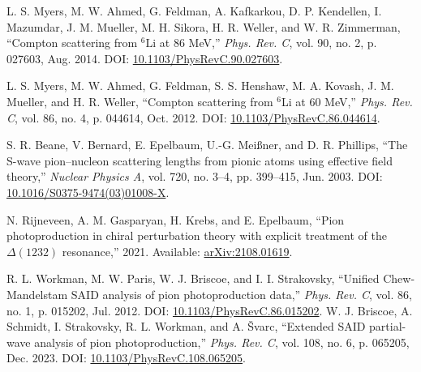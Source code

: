 \documentclass[a4paper,11pt]{article}
\begin{document}
\begin{thebibliography}{99}
L. S. Myers, M. W. Ahmed, G. Feldman, A. Kafkarkou, D. P. Kendellen, I. Mazumdar, J. M. Mueller, M. H. Sikora, H. R. Weller, and W. R. Zimmerman, ``Compton scattering from $^{6}\mathrm{Li}$ at 86 MeV,'' \textit{Phys. Rev. C}, vol. 90, no. 2, p. 027603, Aug. 2014. DOI: \href{https://link.aps.org/doi/10.1103/PhysRevC.90.027603}{10.1103/PhysRevC.90.027603}.

L. S. Myers, M. W. Ahmed, G. Feldman, S. S. Henshaw, M. A. Kovash, J. M. Mueller, and H. R. Weller, ``Compton scattering from $^{6}$Li at 60 MeV,'' \textit{Phys. Rev. C}, vol. 86, no. 4, p. 044614, Oct. 2012. DOI: \href{https://link.aps.org/doi/10.1103/PhysRevC.86.044614}{10.1103/PhysRevC.86.044614}.

S. R. Beane, V. Bernard, E. Epelbaum, U.-G. Meißner, and D. R. Phillips, ``The S-wave pion–nucleon scattering lengths from pionic atoms using effective field theory,'' \textit{Nuclear Physics A}, vol. 720, no. 3–4, pp. 399–415, Jun. 2003. DOI: \href{http://dx.doi.org/10.1016/S0375-9474(03)01008-X}{10.1016/S0375-9474(03)01008-X}.

N. Rijneveen, A. M. Gasparyan, H. Krebs, and E. Epelbaum, ``Pion photoproduction in chiral perturbation theory with explicit treatment of the $\Delta(1232)$ resonance,'' 2021. Available: \href{https://arxiv.org/abs/2108.01619}{arXiv:2108.01619}.

R. L. Workman, M. W. Paris, W. J. Briscoe, and I. I. Strakovsky, ``Unified Chew-Mandelstam SAID analysis of pion photoproduction data,'' \textit{Phys. Rev. C}, vol. 86, no. 1, p. 015202, Jul. 2012. DOI: \href{https://link.aps.org/doi/10.1103/PhysRevC.86.015202}{10.1103/PhysRevC.86.015202}.
W. J. Briscoe, A. Schmidt, I. Strakovsky, R. L. Workman, and A. \ifmmode {}\else \v{S}\fi{}varc, ``Extended SAID partial-wave analysis of pion photoproduction,'' \textit{Phys. Rev. C}, vol. 108, no. 6, p. 065205, Dec. 2023. DOI: \href{https://link.aps.org/doi/10.1103/PhysRevC.108.065205}{10.1103/PhysRevC.108.065205}.

\end{thebibliography}
\end{document}

